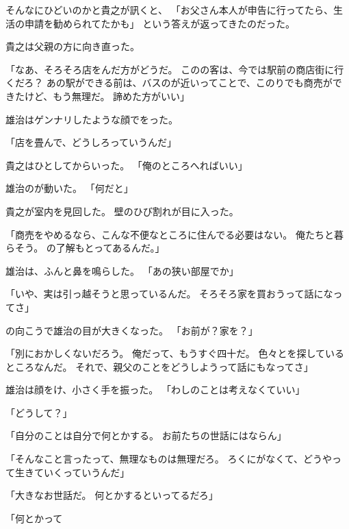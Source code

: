 \documentclass[chapter3.tex]{subfiles}
\begin{document}
\begin{CJK}{UTF8}{ipxm}
    そんなにひどいのかと貴之が訊くと、
    「お父さん本人が申告に行ってたら、生活の申請を勧められてたかも」
    という答えが返ってきたのだった。

    貴之は父親の方に向き直った。

    「なあ、そろそろ店をんだ方がどうだ。
    このの客は、今では駅前の商店街に行くだろ？
    あの駅ができる前は、バスのが近いってことで、このりでも商売ができたけど、もう無理だ。
    諦めた方がいい」

    雄治はゲンナリしたような顔でをった。

    「店を畳んで、どうしろっていうんだ」

    貴之はひとしてからいった。
    「俺のところへればいい」

    雄治のが動いた。
    「何だと」

    貴之が室内を見回した。
    壁のひび割れが目に入った。

    「商売をやめるなら、こんな不便なところに住んでる必要はない。
    俺たちと暮らそう。
    の了解もとってあるんだ。」

    雄治は、ふんと鼻を鳴らした。
    「あの狭い部屋でか」

    「いや、実は引っ越そうと思っているんだ。
    そろそろ家を買おうって話になってさ」

    の向こうで雄治の目が大きくなった。
    「お前が？家を？」

    「別におかしくないだろう。
    俺だって、もうすぐ四十だ。
    色々とを探しているところなんだ。
    それで、親父のことをどうしようって話にもなってさ」

    雄治は顔をけ、小さく手を振った。
    「わしのことは考えなくていい」

    「どうして？」

    「自分のことは自分で何とかする。
    お前たちの世話にはならん」

    「そんなこと言ったって、無理なものは無理だろ。
    ろくにがなくて、どうやって生きていくっていうんだ」

    「大きなお世話だ。
    何とかするといってるだろ」

    「何とかって

\end{CJK}
\end{document}
